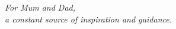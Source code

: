 
\begin{dedication} 

\large{\emph{For Mum and Dad, \\a constant source of inspiration and guidance.}}

\end{dedication}

